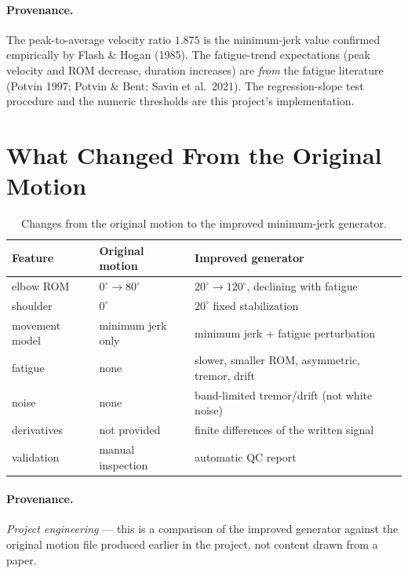\documentclass[11pt]{article}
\newcommand{\dg}{^{\circ}}
\begin{document}
\paragraph{Provenance.} The peak-to-average velocity ratio $1.875$ is the
minimum-jerk value confirmed empirically by Flash \& Hogan (1985). The
fatigue-trend expectations (peak velocity and ROM decrease, duration increases)
are \textit{from} the fatigue literature (Potvin 1997; Potvin \& Bent; Savin et
al.\ 2021). The regression-slope test procedure and the numeric thresholds are
this project's implementation.

\section{What Changed From the Original Motion}

\begin{table}[h]
\centering
\begin{tabular}{lll}
\toprule
\textbf{Feature} & \textbf{Original motion} & \textbf{Improved generator} \\
\midrule
elbow ROM   & $0\dg \rightarrow 80\dg$ & $20\dg \rightarrow 120\dg$, declining with fatigue \\
shoulder    & $0\dg$ & $20\dg$ fixed stabilization \\
movement model & minimum jerk only & minimum jerk $+$ fatigue perturbation \\
fatigue     & none & slower, smaller ROM, asymmetric, tremor, drift \\
noise       & none & band-limited tremor/drift (not white noise) \\
derivatives & not provided & finite differences of the written signal \\
validation  & manual inspection & automatic QC report \\
\bottomrule
\end{tabular}
\caption{Changes from the original motion to the improved minimum-jerk generator.}
\end{table}

\paragraph{Provenance.} \textit{Project engineering} --- this is a comparison of
the improved generator against the original motion file produced earlier in the
project, not content drawn from a paper.
\end{document}
